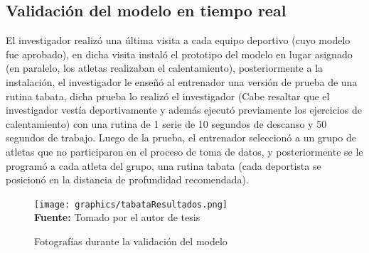 \subsection{Validaci\'on  del modelo en tiempo real}
El investigador realiz\'o una \'ultima visita a cada equipo deportivo (cuyo modelo fue aprobado), en dicha visita instal\'o el prototipo del modelo en lugar asignado (en paralelo, los atletas realizaban el calentamiento), posteriormente a la instalaci\'on, el investigador le ense\~n\'o al entrenador una versi\'on de prueba de una rutina tabata, dicha prueba lo realiz\'o el investigador (Cabe resaltar que el investigador vest\'ia deportivamente y adem\'as ejecut\'o previamente los ejercicios de calentamiento) con una rutina de 1 serie de 10 segundos de descanso y 50 segundos de trabajo. Luego de la prueba, el entrenador seleccion\'o a un grupo de atletas que no participaron en el proceso de toma de datos, y posteriormente se le program\'o a cada atleta del grupo, una rutina tabata (cada deportista se posicion\'o en la distancia de profundidad recomendada).
 \begin{figure}[H]
	\caption{Fotograf\'ias durante la validaci\'on del modelo}
	\label{fig:getvalidationStep}
	\centering
	\texttt{[image: graphics/tabataResultados.png]} \\
	\textbf{Fuente:} Tomado por el autor de tesis
\end{figure} 